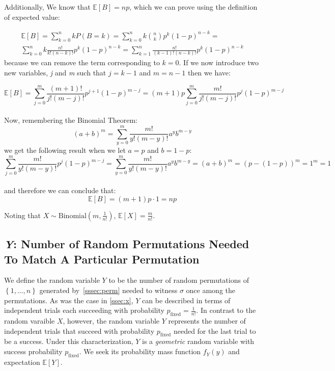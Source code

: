 \documentclass[11pt, oneside]{article}   	%
\begin{document}
Additionally, We know that $\mathbb{E}[B] = np$, which we can prove using the definition of expected value:

\begin{equation*}
\begin{split}
  \mathbb{E}[B] = \sum_{k=0}^{n}kP(B=k)=
  \sum_{k=0}^{n}k\binom{n}{k}p^k(1-p)^{n-k}=\\
  \sum_{k=0}^{n}k \frac{n!}{k!(n-k)!}p^k(1-p)^{n-k}=
  \sum_{k=1}^{n}\frac{n!}{(k-1)!(n-k)!}p^k(1-p)^{n-k}
\end{split}
\end{equation*}
because we can remove the term corresponding to $k=0$. If we now introduce two new variables, \textit{j} and \textit{m} such that $j=k-1$ and $m=n-1$ then we have:

$$\mathbb{E}[B]=\sum_{j=0}^{m}\frac{(m+1)!}{j!(m-j)!}p^{j+1}(1-p)^{m-j}=(m+1)p\sum_{j=0}^m\frac{m!}{j!(m-j)!}p^j(1-p)^{m-j}$$\\
Now, remembering the Binomial Theorem:
\begin{equation}\label{eqn:bt}
(a+b)^m=\sum_{y=0}^{m}\frac{m!}{y!(m-y)!}a^yb^{m-y}
\end{equation}
we get the following result when we let $a=p$ and $b=1-p$:\\
\begin{equation*}
  \sum_{j=0}^{m}\frac{m!}{y!(m-y)!}p^j(1-p)^{m-j}=
  \sum_{y=0}^{m}\frac{m!}{y!(m-y)!}a^yb^{m-y}=
  (a+b)^m=(p-(1-p))^m=1^m=1
\end{equation*}\\
and therefore we can conclude that:
$$\mathbb{E}[B]=(m+1)p\cdot 1=np$$

Noting that $X \sim \text{Binomial}(m,\frac{1}{n!})$, $\mathbb{E}[X] = \frac{m}{n!}$.

\subsection{\textit{Y}: Number of Random Permutations Needed To Match A Particular Permutation}
We define the random variable $Y$ to be the number of random permutations of $\left\{1, \dots, n\right\}$ generated by~\ref{sssec:perm} needed to witness $\sigma$ once among the permutations. As was the case in \ref{ssec:x}, $Y$ can be described in terms of independent trials each succeeding with probability $p_{\text{fixed}} = \frac{1}{n!}$. In contrast to the random varaible $X$, however, the random variable $Y$ represents the number of independent trials that succeed with probability $p_{\text{fixed}}$ needed for the last trial to be a success. Under this characterization, $Y$ is a \textit{geometric} random variable with success probability $p_{\text{fixed}}$. We seek its probability mass function $f_Y(y)$ and expectation $\mathbb{E}[Y]$.
\end{document}
